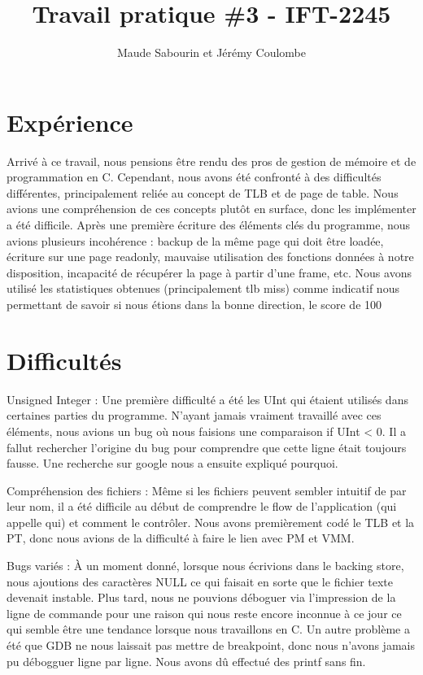 \documentclass{article}
\title{Travail pratique \#3 - IFT-2245}
\author{Maude Sabourin et Jérémy Coulombe}
\begin{document}
\maketitle

\section{Expérience}
Arrivé à ce travail, nous pensions être rendu des pros de gestion de mémoire et de programmation en C. Cependant, nous avons été confronté à des difficultés différentes, principalement reliée au concept de TLB et de page de table. Nous avions une compréhension de ces concepts plutôt en surface, donc les implémenter a été difficile. Après une première écriture des éléments clés du programme, nous avions plusieurs incohérence : backup de la même page qui doit être loadée, écriture sur une page readonly, mauvaise utilisation des fonctions données à notre disposition, incapacité de récupérer la page à partir d’une frame, etc. Nous avons utilisé les statistiques obtenues (principalement tlb miss) comme indicatif nous permettant de savoir si nous étions dans la bonne direction, le score de 100%


\section {Difficultés}
\par
Unsigned Integer : Une première difficulté a été les UInt qui étaient utilisés dans certaines parties du programme. N’ayant jamais vraiment travaillé avec ces éléments, nous avions un bug où nous faisions une comparaison if UInt < 0. Il a fallut rechercher l’origine du bug pour comprendre que cette ligne était toujours fausse. Une recherche sur google nous a ensuite expliqué pourquoi. 

\par
Compréhension des fichiers : Même si les fichiers peuvent sembler intuitif de par leur nom, il a été difficile au début de comprendre le flow de l’application (qui appelle qui) et comment le contrôler. Nous avons premièrement codé le TLB et la PT, donc nous avions de la difficulté à faire le lien avec PM et VMM. 

\par
Bugs variés : À un moment donné, lorsque nous écrivions dans le backing store, nous ajoutions des caractères NULL ce qui faisait en sorte que le fichier texte devenait instable. Plus tard, nous ne pouvions déboguer via l’impression de la ligne de commande pour une raison qui nous reste encore inconnue à ce jour ce qui semble être une tendance lorsque nous travaillons en C. Un autre problème a été que GDB ne nous laissait pas mettre de breakpoint, donc nous n’avons jamais pu débogguer ligne par ligne. Nous avons dû effectué des printf sans fin.
\end{document}
